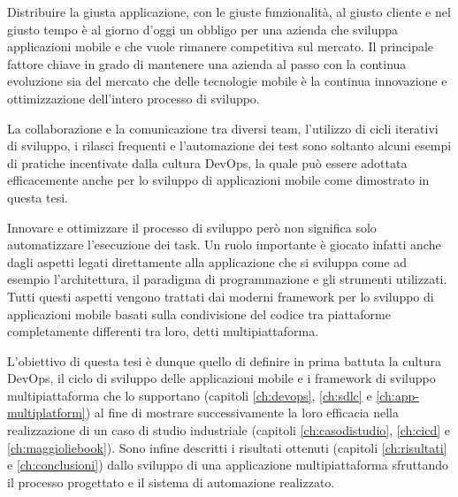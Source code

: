
Distribuire la giusta applicazione, con le giuste funzionalità, al giusto cliente e nel giusto tempo è al giorno d'oggi un obbligo per una azienda che sviluppa applicazioni mobile e che vuole rimanere competitiva sul mercato. Il principale fattore chiave in grado di mantenere una azienda al passo con la continua evoluzione sia del mercato che delle tecnologie mobile è la continua innovazione e ottimizzazione dell'intero processo di sviluppo.

La collaborazione e la comunicazione tra diversi team, l'utilizzo di cicli iterativi di sviluppo, i rilasci frequenti e l'automazione dei test sono soltanto alcuni esempi di pratiche incentivate dalla cultura DevOps, la quale può essere adottata efficacemente anche per lo sviluppo di applicazioni mobile come dimostrato in questa tesi.

Innovare e ottimizzare il processo di sviluppo però non significa solo automatizzare l'esecuzione dei task. Un ruolo importante è giocato infatti anche dagli aspetti legati direttamente alla applicazione che si sviluppa come ad esempio l'architettura, il paradigma di programmazione e gli strumenti utilizzati. Tutti questi aspetti vengono trattati dai moderni framework per lo sviluppo di applicazioni mobile basati sulla condivisione del codice tra piattaforme completamente differenti tra loro, detti multipiattaforma.

L'obiettivo di questa tesi è dunque quello di definire in prima battuta la cultura DevOps, il ciclo di sviluppo delle applicazioni mobile e i framework di sviluppo multipiattaforma che lo supportano (capitoli \ref{ch:devops}, \ref{ch:sdlc} e \ref{ch:app-multiplatform}) al fine di mostrare successivamente la loro efficacia nella realizzazione di un caso di studio industriale (capitoli \ref{ch:casodistudio}, \ref{ch:cicd} e \ref{ch:maggioliebook}). Sono infine descritti i risultati ottenuti (capitoli \ref{ch:risultati} e \ref{ch:conclusioni}) dallo sviluppo di una applicazione multipiattaforma sfruttando il processo progettato e il sistema di automazione realizzato.
